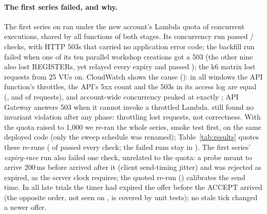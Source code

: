 \paragraph{The first series failed, and why.}
The first series on  ran under the new account's Lambda quota of
\ThrottleConcurrencyAccountConcurrencyMax{} concurrent executions, shared by all functions of both
stages. Its concurrency run passed \ThrottleFirstConcurrencyChecksPassed/\ThrottleFirstConcurrencyChecksTotal{}
checks, with HTTP 503s that carried no application error code; the backfill run failed when one
of its ten parallel workshop creations got a 503 (the other nine also lost REGISTERs, yet relayed
every expiry and passed ); the k6 matrix lost requests from 25 VUs on. CloudWatch shows
the cause (): in all \ThrottleWindows{} windows the API
function's throttles, the API's 5xx count and the 503s in its access log are equal
(\ThrottleConcurrencyApiThrottles, \ThrottleBackfillApiThrottles{} and \ThrottleKsixApiThrottles{} of
\ThrottleKsixRequests{} requests), and account-wide concurrency peaked at exactly
\ThrottleKsixAccountConcurrencyMax; API Gateway answers 503 when it cannot invoke a throttled Lambda.
 still found no invariant violation after any phase: throttling lost requests, not
correctness. With the quota raised to 1{,}000 we re-ran the whole series, smoke test first, on the same
deployed code (only the sweep schedule was renamed); Table~\ref{tab:results} quotes these re-runs
(\SeriesPassed{} of \SeriesExperiments{} passed every check; the failed runs stay in ).
The first series' \emph{expiry-race} run also failed one check, unrelated to the quota: a probe meant to
arrive 200\,ms before  arrived after it (client send-timing jitter) and was rejected
as expired, as the server clock requires; the quoted re-run (\code{\ExpiryRaceRunId}) calibrates the
send time. In all \ExpiryRaceOrderTimerFirst{} late trials the timer had expired the offer before the
ACCEPT arrived (the opposite order, not seen on , is covered by unit tests); no stale tick
changed a newer offer.

